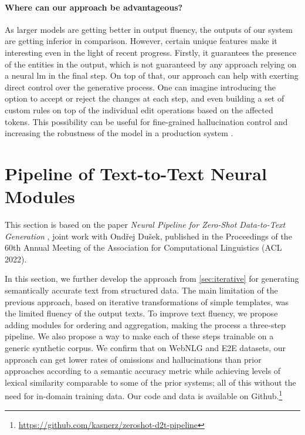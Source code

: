 \paragraph{Where can our approach be advantageous?} As larger models are getting better in output fluency, the outputs of our system are getting inferior in comparison. However, certain unique features make it interesting even in the light of recent progress. Firstly, it guarantees the presence of the entities in the output, which is not guaranteed by any approach relying on a neural \ac{lm} in the final step. On top of that, our approach can help with exerting direct control over the generative process. One can imagine introducing the option to accept or reject the changes at each step, and even building a set of custom rules on top of the individual edit operations based on the affected tokens. This possibility can be useful for fine-grained hallucination control \cite{rebuffel2021controlling,chen2023converge} and increasing the robustness of the model in a production system \cite{heidari2021getting,wang2023interactive}.




\section{Pipeline of Text-to-Text Neural Modules}
\label{sec:pipeline}
\begin{refbox}
    This section is based on the paper \emph{Neural Pipeline for Zero-Shot Data-to-Text Generation} \cite{kasner2022neural}, joint work with Ondřej Dušek, published in the Proceedings of the 60th Annual Meeting of the Association for Computational Linguistics (ACL 2022).
\end{refbox}

In this section, we further develop the approach from \autoref{sec:iterative} for generating semantically accurate text from structured data. The main limitation of the previous approach, based on iterative transformations of simple templates, was the limited fluency of the output texts. To improve text fluency, we propose adding modules for ordering and aggregation, making the process a three-step pipeline. We also propose a way to make each of these steps trainable on a generic synthetic corpus. We confirm that on WebNLG and E2E datasets, our approach can get lower rates of omissions and hallucinations than prior approaches according to a semantic accuracy metric while achieving levels of lexical similarity comparable to some of the prior systems; all of this without the need for in-domain training data. Our code and data is available on Github.\footnote{\url{https://github.com/kasnerz/zeroshot-d2t-pipeline}}


